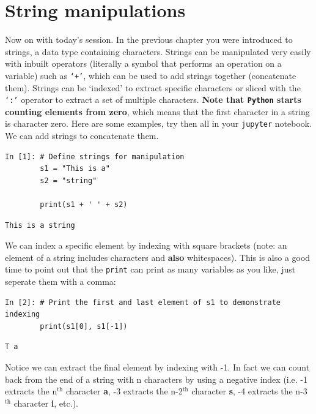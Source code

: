 \section{String manipulations}

\noindent Now on with today's session. In the previous chapter you were introduced to strings, a data type containing characters. Strings can be manipulated very easily with inbuilt operators (literally a symbol that performs an operation on a variable) such as \texttt{`+'}, which can be used to add strings together (concatenate them). Strings can be `indexed' to extract specific characters or sliced with the \texttt{`:'} operator to extract a set of multiple characters. \textbf{Note that \texttt{Python} starts counting elements from zero}, which means that the first character in a string is character zero. Here are some examples, try then all in your \texttt{jupyter} notebook.\\ 

We can add strings to concatenate them.
\begin{lstlisting}[style=PY] 
In [1]: # Define strings for manipulation
        s1 = "This is a"
        s2 = "string"
        
        print(s1 + ' ' + s2)
\end{lstlisting}
\begin{lstlisting}[style=PY_out]
        This is a string
\end{lstlisting}
We can index a specific element by indexing with square brackets (note: an element of a string includes characters and \textbf{also} whitespaces). This is also a good time to point out that the \texttt{print} can print as many variables as you like, just seperate them with a comma:
\begin{lstlisting}[style=PY] 
In [2]: # Print the first and last element of s1 to demonstrate indexing
        print(s1[0], s1[-1])
\end{lstlisting}
\begin{lstlisting}[style=PY_out]
        T a
\end{lstlisting}
Notice we can extract the final element by indexing with -1. In fact we can count back from the end of a string with n characters by using a negative index (i.e. -1 extracts the n$^{\text{th}}$ character \textbf{a}, -3 extracts the n-2$^{\text{th}}$ character \textbf{s}, -4 extracts the n-3$^{\text{th}}$ character \textbf{i}, etc.).\\

